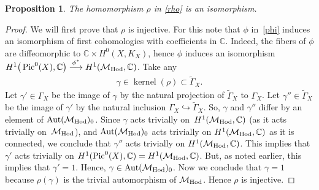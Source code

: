\documentclass[pdftex]{sigma}
\numberwithin{equation}{section}
\newtheorem{Proposition}[Theorem]{Proposition}
 { \theoremstyle{definition}
\newtheorem{Definition}[Theorem]{Definition}
\newtheorem{Remark}[Theorem]{Remark} }
\begin{document}
\begin{Proposition}\label{propo1}
The homomorphism $\rho$ in \eqref{rho} is an isomorphism.
\end{Proposition}

\begin{proof}
We will f\/irst prove that $\rho$ is injective. For this note that $\phi$ in~\eqref{phi} induces an isomorphism of f\/irst cohomologies with coef\/f\/icients in $\mathbb C$. Indeed, the f\/ibers of $\phi$ are dif\/feomorphic to ${\mathbb C}\times H^0(X, K_X)$, hence $\phi$ induces an isomorphism $H^1\big(\operatorname{Pic}^0(X), {\mathbb C}\big) \stackrel{\phi^*}{\longrightarrow} H^1({\mathcal M}_{\rm Hod}, {\mathbb C})$. Take any
\begin{gather*}\gamma \in \operatorname{kernel}(\rho) \subset \widetilde{\Gamma}_X .\end{gather*}
Let $\gamma' \in \Gamma_X$ be the image of $\gamma$ by the natural projection of $\widetilde{\Gamma}_X$ to $\Gamma_X$. Let $\gamma'' \in \widetilde{\Gamma}_X$ be the image of $\gamma'$ by the natural inclusion $\Gamma_X \hookrightarrow  \widetilde{\Gamma}_X$. So, $\gamma$ and $\gamma''$ dif\/fer by an element of $\operatorname{Aut}({\mathcal M}_{\rm Hod})_0$. Since $\gamma$ acts trivially on~$H^1({\mathcal M}_{\rm Hod}, {\mathbb C})$ (as it acts trivially on~${\mathcal M}_{\rm Hod}$), and $\operatorname{Aut}({\mathcal M}_{\rm Hod})_0$ acts trivially on $H^1({\mathcal M}_{\rm Hod}, {\mathbb C})$ as it is connected, we conclude that $\gamma''$ acts trivially on $H^1({\mathcal M}_{\rm Hod}, {\mathbb C})$. This implies that $\gamma'$ acts trivially on $H^1(\operatorname{Pic}^0(X), {\mathbb C}) = H^1({\mathcal M}_{\rm Hod}, {\mathbb C})$. But, as noted earlier, this implies that $\gamma' = 1$. Hence, $\gamma \in \operatorname{Aut}({\mathcal M}_{\rm Hod})_0$. Now we conclude that $\gamma = 1$ because $\rho(\gamma)$ is the trivial automorphism of ${\mathcal M}_{\rm Hod}$. Hence $\rho$ is injective.


\end{proof}
\end{document}
